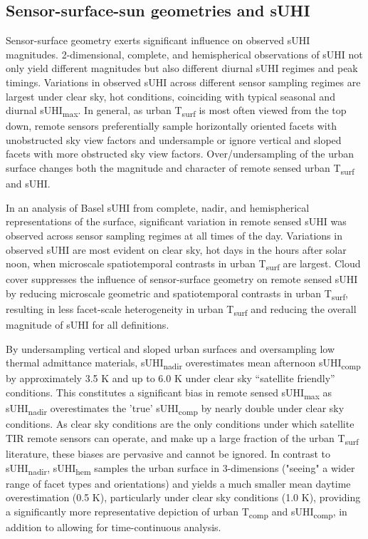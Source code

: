 \begin{bibunit}
\subsection{Sensor-surface-sun geometries and sUHI}

Sensor-surface geometry exerts significant influence on observed sUHI magnitudes. 2-dimensional, complete, and hemispherical observations of sUHI not only yield different magnitudes but also different diurnal sUHI regimes and peak timings. Variations in observed sUHI across different sensor sampling regimes are largest under clear sky, hot conditions, coinciding with typical seasonal and diurnal sUHI\textsubscript{max}. In general, as urban T\textsubscript{surf} is most often viewed from the top down, remote sensors preferentially sample horizontally oriented facets with unobstructed sky view factors and undersample or ignore vertical and sloped facets with more obstructed sky view factors. Over/undersampling of the urban surface changes both the magnitude and character of remote sensed urban T\textsubscript{surf} and sUHI. 

In an analysis of Basel sUHI from complete, nadir, and hemispherical representations of the surface, significant variation in remote sensed sUHI was observed across sensor sampling regimes at all times of the day. Variations in observed sUHI are most evident on clear sky, hot days in the hours after solar noon, when microscale spatiotemporal contrasts in urban T\textsubscript{surf} are largest. Cloud cover suppresses the influence of sensor-surface geometry on remote sensed sUHI by reducing microscale geometric and spatiotemporal contrasts in urban T\textsubscript{surf}, resulting in less facet-scale heterogeneity in urban T\textsubscript{surf} and reducing the overall magnitude of sUHI for all definitions. 

By undersampling vertical and sloped urban surfaces and oversampling low thermal admittance materials, sUHI\textsubscript{nadir} overestimates mean afternoon sUHI\textsubscript{comp} by approximately 3.5 \si{\kelvin} and up to 6.0 \si{\kelvin} under clear sky “satellite friendly” conditions. This constitutes a significant bias in remote sensed sUHI\textsubscript{max} as sUHI\textsubscript{nadir} overestimates the 'true' sUHI\textsubscript{comp} by nearly double under clear sky conditions. As clear sky conditions are the only conditions under which satellite TIR remote sensors can operate, and make up a large fraction of the urban T\textsubscript{surf} literature, these biases are pervasive and cannot be ignored. In contrast to sUHI\textsubscript{nadir}, sUHI\textsubscript{hem} samples the urban surface in 3-dimensions ("seeing" a wider range of facet types and orientations) and yields a much smaller mean daytime overestimation (0.5 \si{\kelvin}), particularly under clear sky conditions (1.0 \si{\kelvin}), providing a significantly more representative depiction of urban T\textsubscript{comp} and sUHI\textsubscript{comp}, in addition to allowing for time-continuous analysis.


\end{bibunit}
